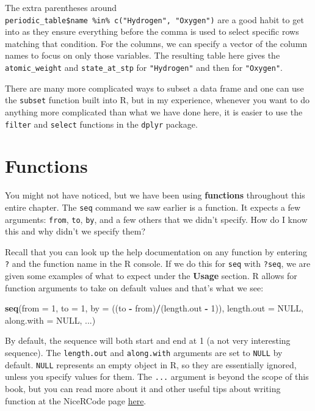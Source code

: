 \documentclass[]{tufte-book}
\newenvironment{Shaded}{\begin{snugshade}}{\end{snugshade}}
\newcommand{\AttributeTok}[1]{\textcolor[rgb]{0.13,0.29,0.53}{#1}}
\newcommand{\ConstantTok}[1]{\textcolor[rgb]{0.56,0.35,0.01}{#1}}
\newcommand{\DecValTok}[1]{\textcolor[rgb]{0.00,0.00,0.81}{#1}}
\newcommand{\FunctionTok}[1]{\textcolor[rgb]{0.13,0.29,0.53}{\textbf{#1}}}
\newcommand{\NormalTok}[1]{#1}
\newcommand{\SpecialCharTok}[1]{\textcolor[rgb]{0.81,0.36,0.00}{\textbf{#1}}}
\begin{document}
The extra parentheses around \texttt{periodic\_table\$name\ \%in\%\ c("Hydrogen",\ "Oxygen")} are a good habit to get into as they ensure everything before the comma is used to select specific rows matching that condition. For the columns, we can specify a vector of the column names to focus on only those variables. The resulting table here gives the \texttt{atomic\_weight} and \texttt{state\_at\_stp} for \texttt{"Hydrogen"} and then for \texttt{"Oxygen"}.

There are many more complicated ways to subset a data frame and one can use the \texttt{subset} function built into R, but in my experience, whenever you want to do anything more complicated than what we have done here, it is easier to use the \texttt{filter} and \texttt{select} functions in the \texttt{dplyr} package.

\section{Functions}\label{functions}

You might not have noticed, but we have been using \textbf{functions} throughout this entire chapter. The \texttt{seq} command we saw earlier is a function. It expects a few arguments: \texttt{from}, \texttt{to}, \texttt{by}, and a few others that we didn't specify. How do I know this and why didn't we specify them?

Recall that you can look up the help documentation on any function by entering \texttt{?} and the function name in the R console. If we do this for \texttt{seq} with \texttt{?seq}, we are given some examples of what to expect under the \textbf{Usage} section. R allows for function arguments to take on default values and that's what we see:

\begin{Shaded}
\begin{Highlighting}[]
\FunctionTok{seq}\NormalTok{(}\AttributeTok{from =} \DecValTok{1}\NormalTok{, }\AttributeTok{to =} \DecValTok{1}\NormalTok{, }\AttributeTok{by =}\NormalTok{ ((to }\SpecialCharTok{{-}}\NormalTok{ from)}\SpecialCharTok{/}\NormalTok{(length.out }\SpecialCharTok{{-}} \DecValTok{1}\NormalTok{)),}
  \AttributeTok{length.out =} \ConstantTok{NULL}\NormalTok{, }\AttributeTok{along.with =} \ConstantTok{NULL}\NormalTok{, ...)}
\end{Highlighting}
\end{Shaded}

By default, the sequence will both start and end at 1 (a not very interesting sequence). The \texttt{length.out} and \texttt{along.with} arguments are set to \texttt{NULL} by default. \texttt{NULL} represents an empty object in R, so they are essentially ignored, unless you specify values for them. The \texttt{...} argument is beyond the scope of this book, but you can read more about it and other useful tips about writing function at the NiceRCode page \href{http://nicercode.github.io/guides/functions/}{here}.
\end{document}
